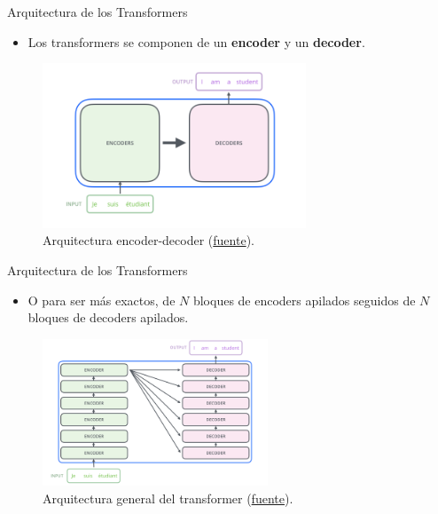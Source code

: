 \begin{frame}{Arquitectura de los Transformers}
\begin{itemize}
    \item Los transformers se componen de un \textbf{encoder} y un \textbf{decoder}.
\end{itemize}

\begin{figure}
    \centering
    \includegraphics[width=0.7\textwidth]{Slides/figures/02_Metodos_Generativos/trans-arch4.png}
    \caption{Arquitectura encoder-decoder (\href{http://jalammar.github.io/illustrated-transformer/}{fuente}).}
\end{figure}
\end{frame}

\begin{frame}{Arquitectura de los Transformers}
\begin{itemize}
    \item O para ser más exactos, de $N$ bloques de encoders apilados seguidos de $N$ bloques de decoders apilados.
\end{itemize}

\begin{figure}
    \centering
    \includegraphics[width=0.6\textwidth]{Slides/figures/02_Metodos_Generativos/trans-arch5.png}
    \caption{Arquitectura general del transformer (\href{http://jalammar.github.io/illustrated-transformer/}{fuente}).}
\end{figure}
\end{frame}

